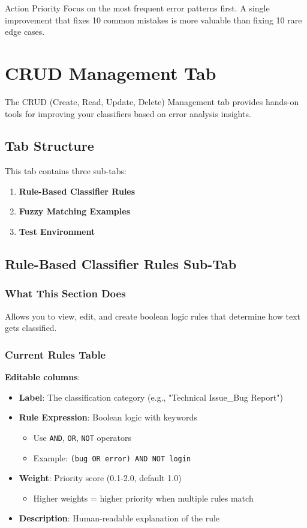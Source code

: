 \documentclass[11pt,a4paper]{article}
\begin{document}
\begin{tipbox}{Action Priority}
Focus on the most frequent error patterns first. A single improvement that fixes 10 common mistakes is more valuable than fixing 10 rare edge cases.
\end{tipbox}

\section{CRUD Management Tab}

The CRUD (Create, Read, Update, Delete) Management tab provides hands-on tools for improving your classifiers based on error analysis insights.

\subsection{Tab Structure}
This tab contains three sub-tabs:
\begin{enumerate}
    \item \textbf{Rule-Based Classifier Rules}
    \item \textbf{Fuzzy Matching Examples}
    \item \textbf{Test Environment}
\end{enumerate}

\subsection{Rule-Based Classifier Rules Sub-Tab}

\subsubsection{What This Section Does}
Allows you to view, edit, and create boolean logic rules that determine how text gets classified.

\subsubsection{Current Rules Table}
\textbf{Editable columns}:
\begin{itemize}
    \item \textbf{Label}: The classification category (e.g., "Technical Issue\_Bug Report")
    \item \textbf{Rule Expression}: Boolean logic with keywords
        \begin{itemize}
            \item Use \texttt{AND}, \texttt{OR}, \texttt{NOT} operators
            \item Example: \texttt{(bug OR error) AND NOT login}
        \end{itemize}
    \item \textbf{Weight}: Priority score (0.1-2.0, default 1.0)
        \begin{itemize}
            \item Higher weights = higher priority when multiple rules match
        \end{itemize}
    \item \textbf{Description}: Human-readable explanation of the rule
\end{itemize}
\end{document}
